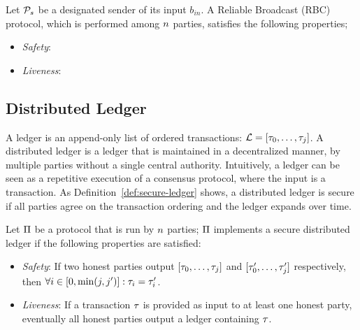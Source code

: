 \begin{definition}\label{def:broadcast}
    Let $\mathcal{P}_s$ be a designated sender of its input $b_{in}$. A Reliable
    Broadcast (RBC) protocol, which is performed among $n$ parties,
    satisfies the following properties;
    \begin{itemize}
        \item \emph{Safety}:
        \item \emph{Liveness}:
    \end{itemize}
\end{definition}

\subsection{Distributed Ledger}\label{subsec:distributed-ledger}

A ledger is an append-only list of ordered transactions: $\mathcal{L} = [\tau_0,
\dots, \tau_j]$. A distributed ledger is a ledger that is maintained in a
decentralized manner, \ie by multiple parties without a single central
authority. Intuitively, a ledger can be seen as a repetitive execution of a
consensus protocol, where the input is a transaction. As
Definition~\ref{def:secure-ledger} shows, a distributed ledger is secure if all
parties agree on the transaction ordering and the ledger expands over time.

\begin{definition}\label{def:secure-ledger}
    Let $\Pi$ be a protocol that is run by $n$ parties; $\Pi$
    implements a secure distributed ledger if the following properties are
    satisfied:
    \begin{itemize}
        \item \emph{Safety}: If two honest parties output $[\tau_0, \dots,
            \tau_j]$ and $[\tau_0', \dots, \tau_j']$ respectively, then $\forall i
            \in [0, \min(j, j')]: \tau_i = \tau_i'$.
        \item \emph{Liveness}: If a transaction $\tau$ is provided as input to
            at least one honest party, eventually all honest parties output a
            ledger containing $\tau$.
    \end{itemize}
\end{definition}
